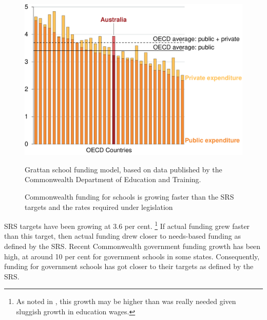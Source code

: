 \documentclass{grattan}
\begin{document}
\begin{figure}
\caption{Commonwealth funding for schools is growing faster than the SRS targets and the rates required under legislation
}\label{fig:recent-commonwealth-funding-growth}


\includegraphics[page=22]{atlas/Charts.pdf}

%
{Grattan school funding model, based on data published by the Commonwealth Department of Education and Training.}
\end{figure}

SRS targets have been growing at 3.6 per cent.%
\footnote{As noted in , this growth may be higher than was really needed given sluggish growth in education wages.}
If actual funding grew faster than this target, then actual funding drew closer to needs-based funding as defined by the SRS\@.
Recent Commonwealth government funding growth has been high, at around 10 per cent for government schools in some states.
Consequently, funding for government schools has got closer to their targets as defined by the SRS.
\end{document}
